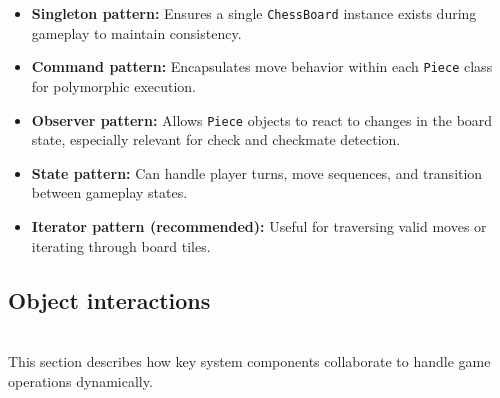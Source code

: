 \begin{itemize}
\item
\protect{}\label{UfOQSzbEsIogaB1AlVXcy}
\textbf{Singleton pattern:} Ensures a single \texttt{ChessBoard} instance exists during gameplay to maintain consistency.
\item
\protect{}\label{p2eR8SomN6Irc6OwIkZze}
\textbf{Command pattern:} Encapsulates move behavior within each \texttt{Piece} class for polymorphic execution.
\item
\protect{}\label{x1DCR5ltib-5fAyzgSivN}
\textbf{Observer pattern:} Allows \texttt{Piece} objects to react to changes in the board state, especially relevant for check and checkmate detection.
\item
\protect{}\label{PEK6Ba9j7v3Xb6bFqeWah}
\textbf{State pattern:} Can handle player turns, move sequences, and transition between gameplay states.
\item
\protect{}\label{wcrQhJqPkEu0yx4w8j5MH}
\textbf{Iterator pattern (recommended):} Useful for traversing valid moves or iterating through board tiles.
\end{itemize}

\subsection{Object interactions}\label{aa7o0d5Q8feyxGTcxrO8u}
\\
This section describes how key system components collaborate to handle game operations dynamically.

